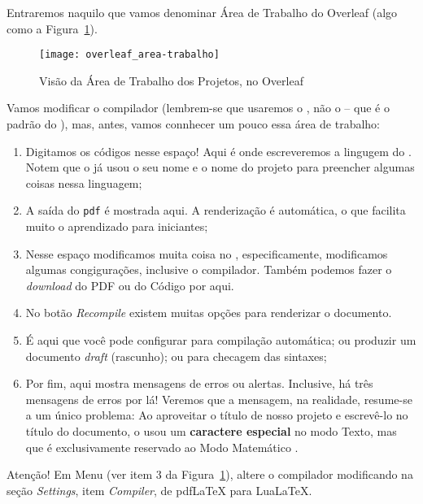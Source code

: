 Entraremos naquilo que vamos denominar {\sffamily Área de Trabalho do Overleaf}
(algo como a Figura~\ref{fig:overleaf_desktop}).

\begin{figure}[!htbp]
  \centering
  \texttt{[image: overleaf\_area-trabalho]}
  \caption{Visão da Área de Trabalho dos Projetos, no Overleaf}
  \label{fig:overleaf_desktop}
\end{figure}

Vamos modificar o compilador (lembrem-se que usaremos o \lualatex, não o 
\pdflatex{} -- que é o padrão do \Overleaf), mas, antes, vamos connhecer 
um pouco essa área de trabalho:

\begin{enumerate}
  \item Digitamos os códigos nesse espaço! 
        Aqui é onde escreveremos a lingugem do .
        Notem que o \Overleaf{} já usou o seu nome e o nome do projeto para 
        preencher algumas coisas nessa linguagem;
  \item A saída do \texttt{pdf} é mostrada aqui.
        A renderização é automática, o que facilita muito o aprendizado para 
        iniciantes;
  \item Nesse espaço modificamos muita coisa no \Overleaf{}, especificamente, 
        modificamos algumas congigurações, inclusive o \textsf{compilador}.
        Também podemos fazer o \textit{download} do PDF ou do Código por aqui.
  \item No botão \textit{Recompile} existem muitas opções para renderizar o 
        documento.
  \item É aqui que você pode configurar para compilação automática; ou produzir
        um documento \textit{draft} (rascunho); ou para checagem das sintaxes;
  \item Por fim, aqui mostra mensagens de erros ou alertas. 
        Inclusive, há três mensagens de erros por lá! 
        Veremos que a mensagem, na realidade, resume-se a um único problema: 
        Ao aproveitar o título de nosso projeto e escrevê-lo no título do 
        documento, o \Overleaf{} usou um \textbf{caractere especial} no modo 
        \textsf{Texto}, mas que é exclusivamente reservado ao 
        \textsf{Modo Matemático} .
\end{enumerate}

\begin{atencao}{Atenção!}{\exclamacao}
  Em \textsf{Menu} (ver item 3 da Figura~\ref{fig:overleaf_desktop}), altere o
  compilador modificando na seção \textit{Settings}, item \textit{Compiler}, de
  \textsf{pdfLaTeX} para \textsf{LuaLaTeX}.
\end{atencao}

